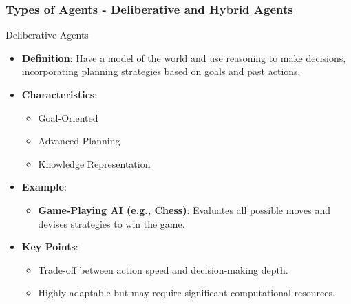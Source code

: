 \documentclass[aspectratio=169]{beamer}
\begin{document}
\begin{frame}[fragile]
    \frametitle{Types of Agents - Deliberative and Hybrid Agents}
    \begin{block}{Deliberative Agents}
        \begin{itemize}
            \item \textbf{Definition}: Have a model of the world and use reasoning to make decisions, incorporating planning strategies based on goals and past actions.
            \item \textbf{Characteristics}:
                \begin{itemize}
                    \item Goal-Oriented
                    \item Advanced Planning
                    \item Knowledge Representation
                \end{itemize}
            \item \textbf{Example}: 
                \begin{itemize}
                    \item \textbf{Game-Playing AI (e.g., Chess)}: Evaluates all possible moves and devises strategies to win the game.
                \end{itemize}
            \item \textbf{Key Points}:
                \begin{itemize}
                    \item Trade-off between action speed and decision-making depth.
                    \item Highly adaptable but may require significant computational resources.
                \end{itemize}
        \end{itemize}
    \end{block}


\end{frame}
\end{document}
